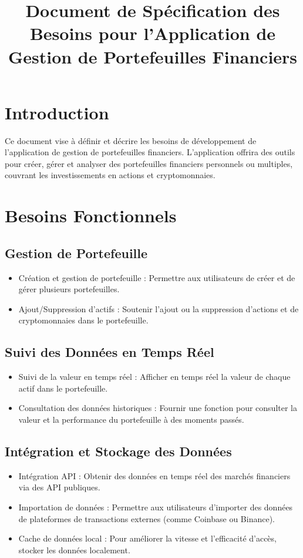 \documentclass{article}
\title{Document de Spécification des Besoins pour l'Application de Gestion de Portefeuilles Financiers}
\date{}
\begin{document}
\maketitle

\section{Introduction}
Ce document vise à définir et décrire les besoins de développement de l'application de gestion de portefeuilles financiers. L'application offrira des outils pour créer, gérer et analyser des portefeuilles financiers personnels ou multiples, couvrant les investissements en actions et cryptomonnaies.

\section{Besoins Fonctionnels}
\subsection{Gestion de Portefeuille}
\begin{itemize}
    \item Création et gestion de portefeuille : Permettre aux utilisateurs de créer et de gérer plusieurs portefeuilles.
    \item Ajout/Suppression d'actifs : Soutenir l'ajout ou la suppression d'actions et de cryptomonnaies dans le portefeuille.
\end{itemize}

\subsection{Suivi des Données en Temps Réel}
\begin{itemize}
    \item Suivi de la valeur en temps réel : Afficher en temps réel la valeur de chaque actif dans le portefeuille.
    \item Consultation des données historiques : Fournir une fonction pour consulter la valeur et la performance du portefeuille à des moments passés.
\end{itemize}

\subsection{Intégration et Stockage des Données}
\begin{itemize}
    \item Intégration API : Obtenir des données en temps réel des marchés financiers via des API publiques.
    \item Importation de données : Permettre aux utilisateurs d'importer des données de plateformes de transactions externes (comme Coinbase ou Binance).
    \item Cache de données local : Pour améliorer la vitesse et l'efficacité d'accès, stocker les données localement.
\end{itemize}
\end{document}
